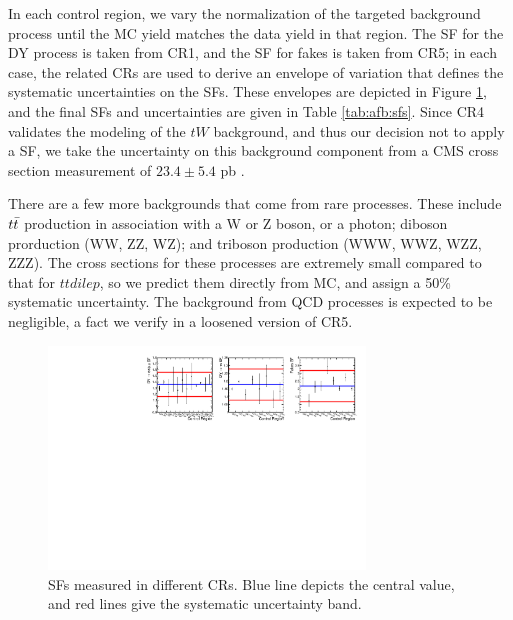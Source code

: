 In each control region, we vary the normalization of the targeted
background process until the MC yield matches the data yield in that
region. The SF for the DY process is taken from CR1, and the SF for
fakes is taken from CR5; in each case, the related CRs are used to
derive an envelope of variation that defines the systematic
uncertainties on the SFs. These envelopes are depicted in Figure
\ref{fig:afb:sfvariations}, and the final SFs and uncertainties are
given in Table \ref{tab:afb:sfs}. Since CR4 validates the modeling of
the $tW$ background, and thus our decision not to apply a SF, we take
the uncertainty on this background component from a CMS cross section
measurement of $23.4 \pm 5.4$ pb \cite{twxsec}.

There are a few more backgrounds that come from rare processes. These
include $t\bar{t}$ production in association with a W or Z boson, or a
photon; diboson prorduction (WW, ZZ, WZ); and triboson production
(WWW, WWZ, WZZ, ZZZ). The cross sections for these processes are
extremely small compared to that for $ttdilep$, so we predict them
directly from MC, and assign a 50\% systematic uncertainty. The
background from QCD processes is expected to be negligible, a fact we
verify in a loosened version of CR5.

\begin{figure}[t]
  \centering
  \includegraphics[width=0.75\textwidth]{figures/SFs_all.pdf}
  \caption{SFs measured in different CRs. Blue line depicts the
    central value, and red lines give the systematic uncertainty band.}
  \label{fig:afb:sfvariations}
\end{figure}

